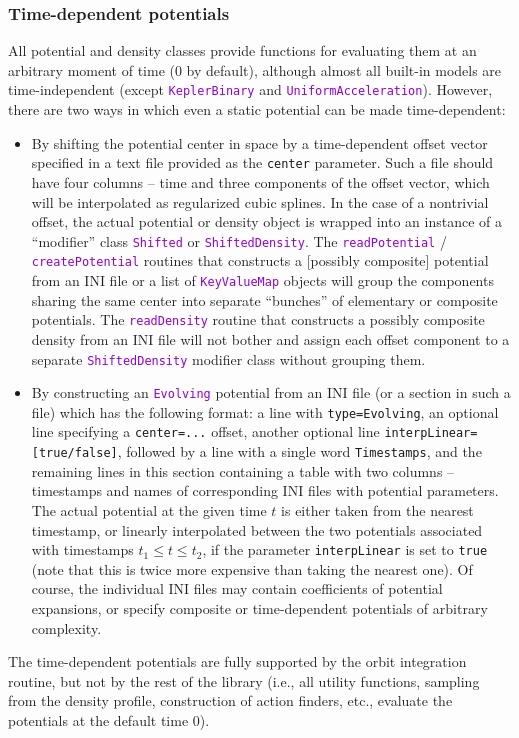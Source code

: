 \documentclass[12pt]{article}
\newcommand{\ttt}[1]{\textcolor{darkviolet}{\texttt{#1}}}
\newcommand{\ppp}[1]{\textcolor{darkolive} {\texttt{#1}}}
\begin{document}
\subsubsection{Time-dependent potentials}  \label{sec:PotentialEvolving}

All potential and density classes provide functions for evaluating them at an arbitrary moment of time (0 by default), although almost all built-in models are time-independent (except \ttt{KeplerBinary} and \ttt{UniformAcceleration}). However, there are two ways in which even a static potential can be made time-dependent:
\begin{itemize}
\item By shifting the potential center in space by a time-dependent offset vector specified in a text file provided as the \ppp{center} parameter. Such a file should have four columns -- time and three components of the offset vector, which will be interpolated as regularized cubic splines. 
In the case of a nontrivial offset, the actual potential or density object is wrapped into an instance of a ``modifier'' class \ttt{Shifted} or \ttt{ShiftedDensity}. The \ttt{readPotential} / \ttt{createPotential} routines that constructs a [possibly composite] potential from an INI file or a list of \ttt{KeyValueMap} objects will group the components sharing the same center into separate ``bunches'' of elementary or composite potentials. The \ttt{readDensity} routine that constructs a possibly composite density from an INI file will not bother and assign each offset component to a separate \ttt{ShiftedDensity} modifier class without grouping them.
\item By constructing an \ttt{Evolving} potential from an INI file (or a section in such a file) which has the following format: a line with \ppp{type=Evolving}, an optional line specifying a \ppp{center=...} offset, another optional line \ppp{interpLinear=[true/false]}, followed by a line with a single word \texttt{Timestamps}, and the remaining lines in this section containing a table with two columns -- timestamps and names of corresponding INI files with potential parameters. The actual potential at the given time $t$ is either taken from the nearest timestamp, or linearly interpolated between the two potentials associated with timestamps $t_1 \le t \le t_2$, if the parameter \ppp{interpLinear} is set to \texttt{true} (note that this is twice more expensive than taking the nearest one). Of course, the individual INI files may contain coefficients of potential expansions, or specify composite or time-dependent potentials of arbitrary complexity.
\end{itemize}
The time-dependent potentials are fully supported by the orbit integration routine, but not by the rest of the library (i.e., all utility functions, sampling from the density profile, construction of action finders, etc., evaluate the potentials at the default time 0).
\end{document}
